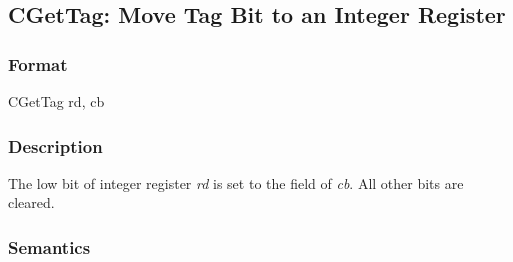 \clearpage
{}
{}
\subsection*{CGetTag: Move Tag Bit to an Integer Register}

\subsubsection*{Format}

CGetTag rd, cb


\begin{center}
\end{center}

\subsubsection*{Description}

The low bit of integer register \emph{rd} is set to the \ctag{} field of
\emph{cb}.  All other bits are cleared.

\subsubsection*{Semantics}


